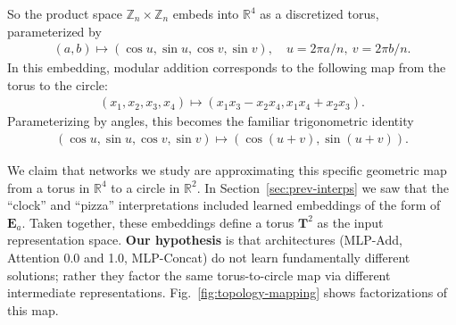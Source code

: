 \documentclass{article} %
\theoremstyle{plain}
\theoremstyle{definition}
\newtheorem{empirical fact}[theorem]{Empirical Fact}
\begin{document}
So the product space $\mathbb{Z}_n\times \mathbb{Z}_n$ embeds into $\mathbb{R}^4$ as a discretized torus, parameterized by
\begin{align*}
    (a, b)\mapsto(\cos u, \sin u, \cos v, \sin v), \quad u= 2\pi a /n, \ v=2\pi b/n.
\end{align*}
In this embedding, modular addition corresponds to the following map from the torus to the circle:
\begin{align*}
    (x_1, x_2, x_3, x_4) \mapsto (x_1 x_3 - x_2 x_4, x_1 x_4 + x_2 x_3).
\end{align*}
Parameterizing by angles, this becomes the familiar trigonometric identity
\begin{align*}
    (\cos u, \sin u, \cos v, \sin v) \mapsto (\cos(u+v), \sin(u+v)).
\end{align*}

We claim that networks we study are approximating this specific geometric map from a torus in $\mathbb{R}^4$ to a circle in $\mathbb{R}^2$.
In Section~\ref{sec:prev-interps} we saw that the ``clock'' and ``pizza'' interpretations included learned embeddings of the form of $\mathbf{E}_a$. 
Taken together, these embeddings define a torus $\mathbf{T}^2$ as the input representation space.
\textbf{Our hypothesis} is that architectures (MLP-Add, Attention 0.0 and 1.0, MLP-Concat) do not learn fundamentally different solutions; rather they factor the same torus-to-circle map via different intermediate representations. Fig.~\ref{fig:topology-mapping} shows factorizations of this map.
\end{document}

